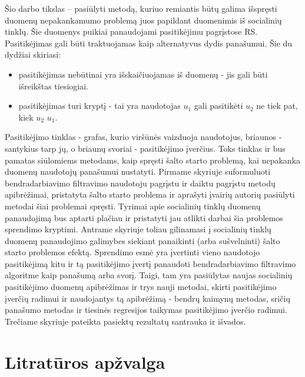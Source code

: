 \documentclass{VUMIFInfMagistrinis}
\begin{document}
\newline
\indent
Šio darbo tikslas – pasiūlyti metodą, kuriuo remiantis būtų galima išspręsti duomenų nepakankamumo problemą juos papildant duomenimis iš socialinių tinklų. Šie duomenys puikiai panaudojami pasitikėjimu pagrįstose RS. Pasitikėjimas gali būti traktuojamas kaip alternatyvus dydis panašumui. Šie du dydžiai skiriasi:
\begin{itemize}
	\item pasitikėjimas nebūtinai yra išskaičiuojamas iš duomenų - jis gali būti išreikštas tiesiogiai.
	\item pasitikėjimas turi kryptį - tai yra naudotojas $u_1$ gali pasitikėti $u_2$ ne tiek pat, kiek $u_2$ $u_1$.
\end{itemize}
Pasitikėjimo tinklas - grafas, kurio viršūnės vaizduoja naudotojus, briaunos - santykius tarp jų, o briaunų svoriai - pasitikėjimo įverčius. Toks tinklas ir bus pamatas siūlomiems metodams, kaip spręsti šalto starto problemą, kai nepakanka duomenų naudotojų panašumui nustatyti.
\newline
\indent 
Pirmame skyriuje suformuluoti bendradarbiavimo filtravimo naudotoju pagrįstu ir daiktu pagrįstu metodų apibrėžimai, pristatyta šalto starto problema ir aprašyti įvairių autorių pasiūlyti metodai šiai problemai spręsti. Tyrimai apie socialinių tinklų duomenų panaudojimą bus aptarti plačiau ir pristatyti jau atlikti darbai šia problemos sprendimo kryptimi. Antrame skyriuje toliau gilinamasi į socialinių tinklų duomenų panaudojimo galimybes siekiant panaikinti (arba sušvelninti) šalto starto problemos efektą. Sprendimo esmė yra įvertinti vieno naudotojo pasitikėjimą kitu ir tą pasitikėjimo įvertį panaudoti bendradarbiavimo filtravimo algoritme kaip panašumą arba svorį. Taigi, tam yra pasiūlytas naujas socialinių pasitikėjimo duomenų apibrėžimas ir trys nauji metodai, skirti pasitikėjimo įverčių radimui ir naudojantys tą apibrėžimą - bendrų kaimynų metodas, sričių panašumo metodas ir tiesinės regresijos taikymas pasitikėjimo įverčio radimui. Trečiame skyriuje pateikta pasiektų rezultatų santrauka ir išvados.


\section{Litratūros apžvalga}

\end{document}
